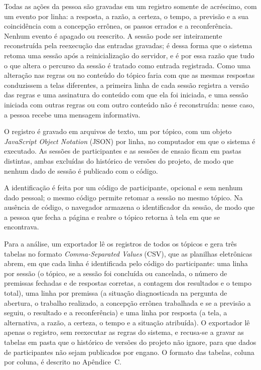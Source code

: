 Todas as ações da pessoa são gravadas em um registro somente de acréscimo, com um evento por linha: a resposta, a razão, a certeza, o tempo, a previsão e a sua coincidência com a concepção errônea, os passos errados e a reconferência. Nenhum evento é apagado ou reescrito. A sessão pode ser inteiramente reconstruída pela reexecução das entradas gravadas; é dessa forma que o sistema retoma uma sessão após a reinicialização do servidor, e é por essa razão que tudo o que altera o percurso da sessão é tratado como entrada registrada. Como uma alteração nas regras ou no conteúdo do tópico faria com que as mesmas respostas conduzissem a telas diferentes, a primeira linha de cada sessão registra a versão das regras e uma assinatura do conteúdo com que ela foi iniciada, e uma sessão iniciada com outras regras ou com outro conteúdo não é reconstruída: nesse caso, a pessoa recebe uma mensagem informativa.

O registro é gravado em arquivos de texto, um por tópico, com um objeto \textit{JavaScript Object Notation} (JSON) por linha, no computador em que o sistema é executado. As sessões de participantes e as sessões de ensaio ficam em pastas distintas, ambas excluídas do histórico de versões do projeto, de modo que nenhum dado de sessão é publicado com o código.

A identificação é feita por um código de participante, opcional e sem nenhum dado pessoal; o mesmo código permite retomar a sessão no mesmo tópico. Na ausência de código, o navegador armazena o identificador da sessão, de modo que a pessoa que fecha a página e reabre o tópico retorna à tela em que se encontrava.

Para a análise, um exportador lê os registros de todos os tópicos e gera três tabelas no formato \textit{Comma-Separated Values} (CSV), que as planilhas eletrônicas abrem, em que cada linha é identificada pelo código do participante: uma linha por sessão (o tópico, se a sessão foi concluída ou cancelada, o número de premissas fechadas e de respostas corretas, a contagem dos resultados e o tempo total), uma linha por premissa (a situação diagnosticada na pergunta de abertura, o trabalho realizado, a concepção errônea trabalhada e se a previsão a seguiu, o resultado e a reconferência) e uma linha por resposta (a tela, a alternativa, a razão, a certeza, o tempo e a situação atribuída). O exportador lê apenas o registro, sem reexecutar as regras do sistema, e recusa-se a gravar as tabelas em pasta que o histórico de versões do projeto não ignore, para que dados de participantes não sejam publicados por engano. O formato das tabelas, coluna por coluna, é descrito no Apêndice~C.

